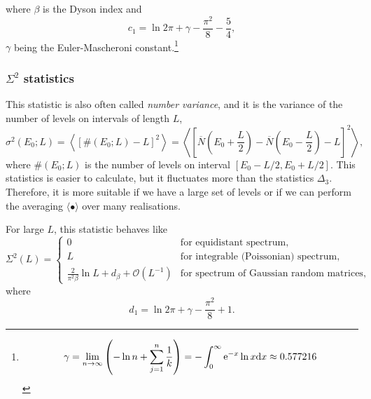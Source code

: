 \documentclass[a4paper,11pt,twoside]{article}
\begin{document}
            where $\beta$ is the Dyson index and
            \begin{equation}
                c_{1}=\ln{2\pi}+\gamma-\frac{\pi^{2}}{8}-\frac{5}{4},
            \end{equation}
            $\gamma$ being the Euler-Mascheroni constant.\footnote{
                \begin{equation}
                    \gamma
                        =\lim_{n\rightarrow\infty}\left(-\ln{n}+\sum_{j=1}^{n}\frac{1}{k}\right)
                        =-\int_{0}^{\infty}\operatorname{e}^{-x}\ln{x}\mathrm{d} x\approx0.577216
                \end{equation}
            }

        \subsubsection{$\Sigma^{2}$ statistics}
            This statistic is also often called \emph{number variance}, and it is the variance of the number of levels on intervals of length $L$,
            \begin{equation}
                \sigma^{2}(E_{0};L)
                    =\left\langle\left[\#(E_{0};L)-L\right]^{2}\right\rangle
                    =\left\langle\left[\overline{N}\left(E_{0}+\frac{L}{2}\right)-\overline{N}\left(E_{0}-\frac{L}{2}\right)-L\right]^{2}\right\rangle,
                \label{eq:Sigma2}
            \end{equation}  
            where $\#(E_{0};L)$ is the number of levels on interval $[E_{0}-L/2,E_{0}+L/2]$.
            This statistics is easier to calculate, but it fluctuates more than the statistics $\Delta_{3}$.
            Therefore, it is more suitable if we have a large set of levels or if we can perform the averaging $\langle\bullet\rangle$ over many realisations. 
            
            For large $L$, this statistic behaves like
            \begin{equation}
                \Sigma^{2}(L)=\left\{\begin{array}{ll}
                    0 & \text{for equidistant spectrum},\\
                    L & \text{for integrable (Poissonian) spectrum},\\
                    \frac{2}{\pi^{2}\beta}\ln L+d_{\beta}+\mathcal{O}(L^{-1}) & \text{for spectrum of Gaussian random matrices},
                \end{array}\right.
            \end{equation}
            where
            \begin{equation}
                d_{1}=\ln{2\pi}+\gamma-\frac{\pi^{2}}{8}+1.
            \end{equation}
\end{document}
